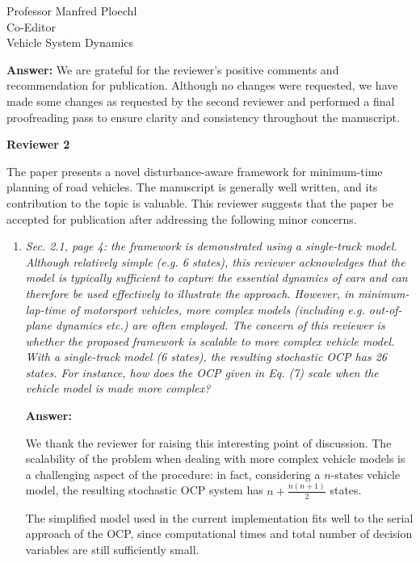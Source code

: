 \documentclass{letter}
\begin{document}
\begin{letter}{Professor Manfred Ploechl\\
Co-Editor\\
Vehicle System Dynamics}
\begin{enumerate}
\vspace{2mm}

\textbf{Answer:} We are grateful for the reviewer's positive comments and recommendation for publication. Although no changes were requested, we have made some changes as requested by the second reviewer and performed a final proofreading pass to ensure clarity and consistency throughout the manuscript.

\hrulefill
\end{enumerate}

\textbf{Reviewer 2}

The paper presents a novel disturbance-aware framework for minimum-time planning of road vehicles.
The manuscript is generally well written, and its contribution to the topic is valuable.
This reviewer suggests that the paper be accepted for publication after addressing the following minor concerns.

\begin{enumerate}

\item
\textit{Sec. 2.1, page 4: the framework is demonstrated using a single-track model. Although relatively simple (e.g. 6 states), this reviewer acknowledges that the model is typically sufficient to capture the essential dynamics of cars and can therefore be used effectively to illustrate the approach. However, in minimum-lap-time of motorsport vehicles, more complex models (including e.g. out-of-plane dynamics etc.) are often employed. The concern of this reviewer is whether the proposed framework is scalable to more complex vehicle model. With a single-track model (6 states), the resulting stochastic OCP has 26 states. For instance, how does the OCP given in Eq. (7) scale when the vehicle model is made more complex?
}

\vspace{2mm}

\textbf{Answer:}

We thank the reviewer for raising this interesting point of discussion. The scalability of the problem when dealing with more complex vehicle models is a challenging aspect of the procedure: in fact, considering a $n$-states vehicle model, the resulting stochastic OCP system has $n+\frac{n(n+1)}{2}$ states.

The simplified model used in the current implementation fits well to the serial approach of the OCP, since computational times and total number of decision variables are still sufficiently small.


\end{enumerate}
\end{letter}
\end{document}
